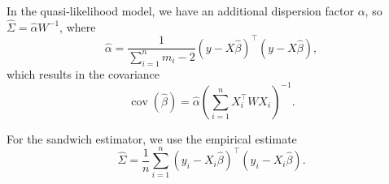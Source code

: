 \documentclass[11pt, letterpaper]{article}
\begin{document}
\begin{description}
  In the quasi-likelihood model, we have an additional dispersion factor
  $\alpha$, so $\hat{\Sigma} = \hat{\alpha}W^{-1}$, where
  \begin{equation}
    \hat{\alpha} = \frac{1}{\sum_{i=1}^n m_i - 2}
    \left(y - X\hat{\beta}\right)^\intercal\left(y - X\hat{\beta}\right),
  \end{equation}
  which results in the covariance
  \begin{equation}
    \operatorname{cov}\left(\hat{\beta}\right)
    = \hat{\alpha} \left(\sum_{i=1}^n X_i^\intercal W X_i\right)^{-1}.
  \end{equation}

  For the sandwich estimator, we use the empirical estimate
  \begin{equation}
    \hat{\Sigma} = \frac{1}{n}\sum_{i=1}^n
    \left(y_i - X_i\hat{\beta}\right)^\intercal \left(y_i - X_i\hat{\beta}\right).
  \end{equation}
  
\end{description}
\end{document}
